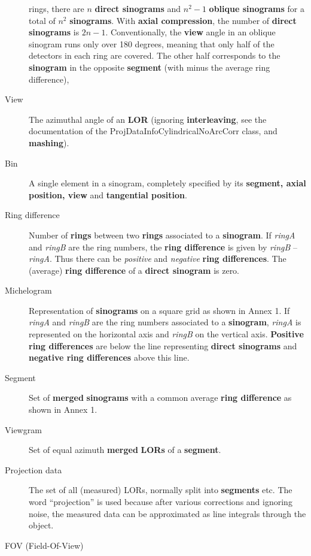 \documentclass{article}
\begin{document}
\begin{description}
{rings}, there are $n$ \textbf{direct sinograms} and $n^2-1$ \textbf{oblique 
sinograms} for a total of $n^2$ \textbf{sinograms}. With \textbf{axial 
compression}, the number of \textbf{direct sinograms} is $2n-1$. Conventionally, 
the \textbf{view} angle in an oblique sinogram runs only over 180 
degrees, meaning that only half of the detectors in each ring 
are covered. The other half corresponds to the \textbf{sinogram} in 
the opposite \textbf{segment} (with minus the average ring difference),
\item[View] 
The azimuthal angle of an \textbf{LOR} (ignoring \textbf{interleaving}, 
see the documentation of the ProjDataInfoCylindricalNoArcCorr 
class, and \textbf{mashing}).
\item[Bin] 
A single element in a sinogram, completely specified by its \textbf{segment, 
axial} \textbf{position, view} and \textbf{tangential position}.
\item[Ring difference] 
Number of \textbf{rings} between two \textbf{rings} associated to a \textbf{sinogram}. 
If \textit{ringA} and \textit{ringB} are the ring numbers, the \textbf{ring 
difference} is given by \textit{ringB} -- \textit{ringA}. Thus there can be \textit{positive} 
and \textit{negative} \textbf{ring differences}. \linebreak
The (average) \textbf{ring difference} of a \textbf{direct sinogram} is 
zero.
\item[Michelogram] 
Representation of \textbf{sinograms} on a square grid as shown in 
Annex 1. If \textit{ringA} and \textit{ringB} are the ring numbers associated 
to a \textbf{sinogram}, \textit{ringA} is represented on the horizontal 
axis and \textit{ringB} on the vertical axis. \textbf{Positive ring differences} 
are below the line representing \textbf{direct sinograms} and \textbf{negative 
ring differences} above this line.
\item[Segment] 
Set of \textbf{merged} \textbf{sinograms} with a common average \textbf{ring 
difference} as shown in Annex 1.
\item[Viewgram] 
Set of equal azimuth \textbf{merged} \textbf{LORs} of a \textbf{segment}.
\item[Projection data]
The set of all (measured) LORs, normally split into \textbf{segments} etc.
The word ``projection'' is used because after various corrections and
ignoring noise, the measured data can be approximated as line integrals 
through the object.
\item[FOV (Field-Of-View)] 

\end{description}
\end{document}
